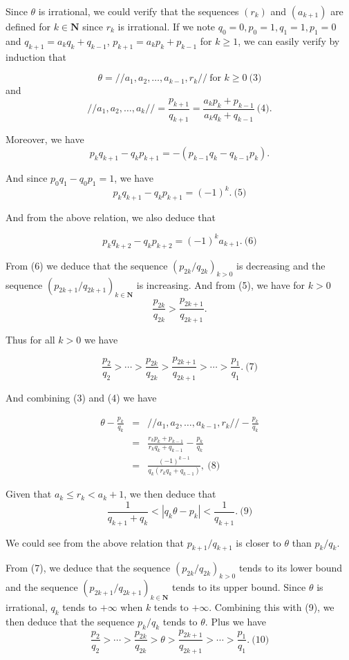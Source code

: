 \documentclass[a4paper,12pt]{article}
\begin{document}
Since $\theta$ is irrational, we could verify that the sequences
$(r_k)$ and $(a_{k+1})$ are defined for $k \in \textbf{N}$ since $r_k$
is irrational.  If we note $q_0 = 0, p_0 = 1, q_1 = 1, p_1 = 0$ and
$q_{k+1} = a_k q_k + q_{k-1}$, $p_{k+1} = a_k p_k + p_{k-1}$ for $k\ge
1$, we can easily verify by induction that

\[ \theta = //a_1,a_2,\ldots,a_{k-1},r_k //\ \mbox{for $k\ge 0$}\ \mbox{(3)}\]
and
\[ //a_1, a_2, \ldots, a_k // = \frac{p_{k+1}}{q_{k+1}} = \frac{a_k
  p_k + p_{k-1}}{a_k q_k + q_{k-1}}\ \mbox{(4)}.\]

Moreover, we have
\[p_k q_{k+1} - q_k p_{k+1} = - (p_{k-1}q_k - q_{k-1}p_k).\]

And since $p_0 q_1 - q_0 p_1 = 1$, we have
\[ p_k q_{k+1} - q_k p_{k+1} = (-1)^k.\ \mbox{(5)}\]

And from the above relation, we also deduce that

\[ p_kq_{k+2} - q_k p_{k+2} = (-1)^ka_{k+1}.\ \mbox{(6)}\]

From (6) we deduce that the sequence $(p_{2k}/q_{2k})_{k>0}$ is
decreasing and the sequence $(p_{2k+1}/q_{2k+1})_{k \in \textbf{N}}$ is
increasing.  And from (5), we have for $k>0$
\[ \frac{p_{2k}}{q_{2k}} > \frac{p_{2k+1}}{q_{2k+1}}.\]

Thus for all $k>0$ we have

\[ \frac{p_2}{q_2} > \cdots > \frac{p_{2k}}{q_{2k}} >
\frac{p_{2k+1}}{q_{2k+1}} > \cdots > \frac{p_1}{q_1}.\ \mbox{(7)}\]

And combining (3) and (4) we have

\begin{eqnarray*}
  \theta - \frac{p_k}{q_k} &=&
  //a_1, a_2,\ldots, a_{k-1}, r_k// - \frac{p_k}{q_k}\\ &=&
  \frac{r_k p_k + p_{k-1}}{r_k q_k + q_{k-1}} - \frac{p_k}{q_k} \\ &=&
  \frac{(-1)^{k-1}}{q_k(r_k q_k + q_{k-1})},\ \mbox{(8)}
\end{eqnarray*}

Given that $a_k \le r_k < a_k + 1$, we then deduce that
\[ \frac{1}{q_{k+1}+q_k}<|q_k\theta - p_k| < \frac{1}{q_{k+1}}.\ \mbox{(9)}\]

We could see from the above relation that $p_{k+1}/q_{k+1}$ is closer
to $\theta$ than $p_k/q_k$.

From (7), we deduce that the sequence $(p_{2k}/q_{2k})_{k>0}$ tends to
its lower bound and the sequence $(p_{2k+1}/q_{2k+1})_{k \in
  \textbf{N}}$ tends to its upper bound.  Since $\theta$ is
irrational, $q_k$ tends to $+\infty$ when $k$ tends to $+\infty$.
Combining this with (9), we then deduce that the sequence $p_k/q_k$
tends to $\theta$.  Plus we have
\[ \frac{p_2}{q_2} > \cdots > \frac{p_{2k}}{q_{2k}} > \theta >
\frac{p_{2k+1}}{q_{2k+1}} > \cdots > \frac{p_1}{q_1}.\ \mbox{(10)}\]
\end{document}
